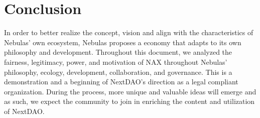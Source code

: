 \section{Conclusion}
In order to better realize the concept, vision and align with the characteristics of Nebulas' own ecosystem, Nebulas proposes a economy that adapts to its own philosophy and development. Throughout this document, we analyzed the fairness, legitimacy, power, and motivation of NAX throughout Nebulas' philosophy, ecology, development, collaboration, and governance. This is a demonstration and a beginning of NextDAO's direction as a legal compliant organization. During the process, more unique and valuable ideas will emerge and as such, we expect the community to join in enriching the content and utilization of NextDAO.
